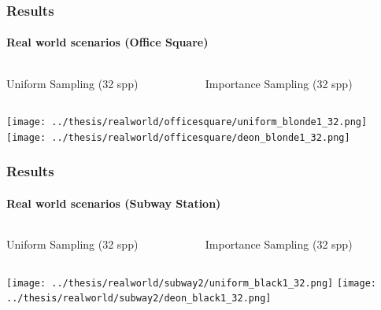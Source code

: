 \documentclass{beamer}
\begin{document}
  \begin{frame}
    \frametitle{Results}
    \framesubtitle{Real world scenarios (Office Square)}
    \centering
    
    \begin{columns}
    \begin{column}{0.5\textwidth}
    \centering
    Uniform Sampling (32 spp) 
    \end{column}
	\begin{column}{0.5\textwidth}
	\centering
	Importance Sampling (32 spp)
	\end{column}
	\end{columns}  
    
	\texttt{[image: ../thesis/realworld/officesquare/uniform\_blonde1\_32.png]}  
	\texttt{[image: ../thesis/realworld/officesquare/deon\_blonde1\_32.png]}   
  \end{frame}
  
    \begin{frame}
    \frametitle{Results}
    \framesubtitle{Real world scenarios (Subway Station)}
    \centering
    
    \begin{columns}
    \begin{column}{0.5\textwidth}
    \centering
    Uniform Sampling (32 spp) 
    \end{column}
	\begin{column}{0.5\textwidth}
	\centering
	Importance Sampling (32 spp)
	\end{column}
	\end{columns}  
    
	\texttt{[image: ../thesis/realworld/subway2/uniform\_black1\_32.png]}  
	\texttt{[image: ../thesis/realworld/subway2/deon\_black1\_32.png]}   
  \end{frame}
  
   
\end{document}
